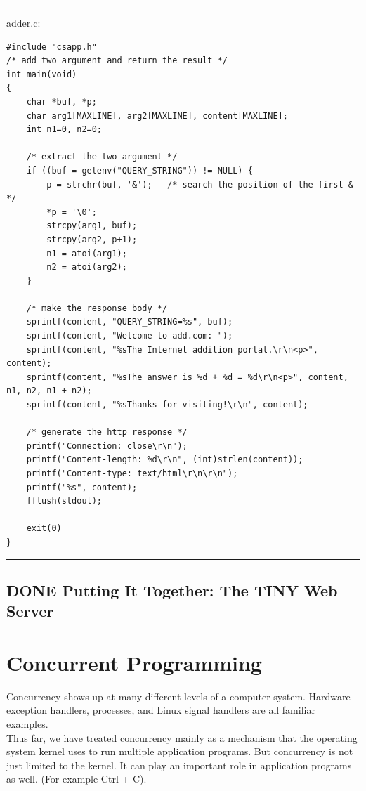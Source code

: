 \documentclass[11pt]{article}
\begin{document}
\begin{enumerate}
\noindent\rule{\textwidth}{0.5pt}
adder.c:\\
\begin{verbatim}
#include "csapp.h"
/* add two argument and return the result */
int main(void)
{
    char *buf, *p;
    char arg1[MAXLINE], arg2[MAXLINE], content[MAXLINE];
    int n1=0, n2=0;

    /* extract the two argument */
    if ((buf = getenv("QUERY_STRING")) != NULL) {
        p = strchr(buf, '&');	/* search the position of the first & */
        *p = '\0';
        strcpy(arg1, buf);
        strcpy(arg2, p+1);
        n1 = atoi(arg1);
        n2 = atoi(arg2);
    }

    /* make the response body */
    sprintf(content, "QUERY_STRING=%s", buf);
    sprintf(content, "Welcome to add.com: ");
    sprintf(content, "%sThe Internet addition portal.\r\n<p>", content);
    sprintf(content, "%sThe answer is %d + %d = %d\r\n<p>", content, n1, n2, n1 + n2);
    sprintf(content, "%sThanks for visiting!\r\n", content);

    /* generate the http response */
    printf("Connection: close\r\n");
    printf("Content-length: %d\r\n", (int)strlen(content));
    printf("Content-type: text/html\r\n\r\n");
    printf("%s", content);
    fflush(stdout);

    exit(0)
}

\end{verbatim}

\noindent\rule{\textwidth}{0.5pt}
\end{enumerate}

\subsection{{\bfseries\sffamily DONE} Putting It Together: The TINY Web Server}
\label{sec:org5a8385c}

\section{Concurrent Programming}
\label{sec:orgc7d9f6b}
Concurrency shows up at many different levels of a computer system. Hardware exception handlers, processes, and Linux signal handlers are all familiar examples.\\

Thus far, we have treated concurrency mainly as a mechanism that the operating system kernel uses to run multiple application programs. But concurrency is not just limited to the kernel. It can play an important role in application programs as well. (For example Ctrl + C).\\
\end{document}
